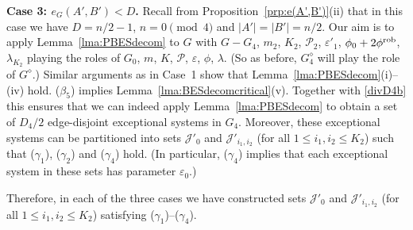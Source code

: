 \documentclass{memo-l}
\def\cP{\mathcal{P}}
\def\eps{\varepsilon}
\numberwithin{section}{chapter}
\numberwithin{equation}{section}
\numberwithin{firstthm}{section}
\numberwithin{figure}{section}
\begin{document}
{\noindent\textbf{Case 3: $e_G(A',B') < D$.}
Recall from Proposition~\ref{prp:e(A',B')}(ii) that in this case we have $D = n/2 - 1$, $n = 0 \pmod 4$ and $|A'| = |B'| = n/2$.
Our aim is to apply Lemma~\ref{lma:PBESdecom} to $G$ with $G - G_4$, $m_2$, $K_2$, $\cP_2$, $\eps'_1$, $\phi_0+2 \phi^{\rm rob}$, $ \lambda_{K_2}$
playing the roles of $G_0$, $m$, $K$, $\cP$, $\eps$, $\phi$, $\lambda$.
(So as before, $G^{\diamond}_4$ will play the role of $G^{\diamond}$.) Similar arguments as in Case~1 show that
Lemma~\ref{lma:PBESdecom}(i)--(iv) hold. ($ \beta_5$) implies Lemma~\ref{lma:BESdecomcritical}(v).
Together with \eqref{divD4b} this ensures that we can indeed apply 
Lemma~\ref{lma:PBESdecom} to obtain a set of $D_4 /2 $ edge-disjoint exceptional systems in $G_4$.
Moreover, these exceptional systems can be partitioned into sets $\mathcal{J}'_0$ and $\mathcal{J}'_{i_1,i_2}$ (for all $1 \le i_1, i_2  \le K_2$)
such that ($\gamma_1$), ($\gamma_2$) and ($\gamma_4$) hold. (In particular, ($\gamma_4$) implies that each exceptional system
in these sets has parameter $\eps_0$.)

\smallskip

Therefore, in each of the three cases we have constructed sets $\mathcal{J}'_0$ and $\mathcal{J}'_{i_1,i_2}$ (for all $1 \le i_1, i_2  \le K_2$)
satisfying ($\gamma_1$)--($\gamma_4$).

}
\end{document}
